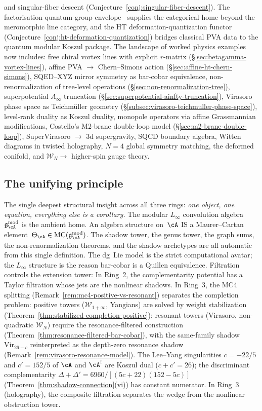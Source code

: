 \begin{enumerate}
  and singular-fiber descent
  (Conjecture~\ref{conj:singular-fiber-descent}).
  The factorisation quantum-group envelope~\cite{Latyntsev23}
  supplies the categorical home beyond the meromorphic line category,
  and the HT deformation-quantization functor
  (Conjecture~\ref{conj:ht-deformation-quantization})
  bridges classical PVA data to the quantum modular Koszul package.
  The landscape of worked physics examples now includes:
  free chiral vortex lines with explicit $r$-matrix
  (\S\ref{sec:betagamma-vortex-lines}),
  affine PVA $\to$ Chern--Simons action
  (\S\ref{sec:affine-ht-chern-simons}),
  SQED--XYZ mirror symmetry as bar-cobar equivalence,
  non-renormalization of tree-level operations
  (\S\ref{sec:non-renormalization-tree}),
  superpotential $A_\infty$ truncation
  (\S\ref{sec:superpotential-ainfty-truncation}),
  Virasoro phase space as Teichm\"uller geometry
  (\S\ref{subsec:virasoro-teichmuller-phase-space}),
  level-rank duality as Koszul duality,
  monopole operators via affine Grassmannian modifications,
  Costello's M2-brane double-loop model
  (\S\ref{sec:m2-brane-double-loop}),
  SuperVirasoro $\to$ 3d supergravity,
  SQCD boundary algebra,
  Witten diagrams in twisted holography,
  $N=4$ global symmetry matching,
  the deformed conifold,
  and $\mathcal{W}_N \to$ higher-spin gauge theory.
\end{enumerate}

\subsection*{The unifying principle}
The single deepest structural insight across all three rings:
\emph{one object, one equation, everything else is a corollary.}
The modular $L_\infty$ convolution algebra~$\mathfrak{g}_\cA^{\mathrm{mod}}$
is the ambient home.  An algebra structure on~$\cA$ IS a Maurer--Cartan
element~$\Theta_\cA \in \mathrm{MC}(\mathfrak{g}_\cA^{\mathrm{mod}})$.
The shadow tower, the genus tower, the graph sums, the non-renormalization
theorems, and the shadow archetypes are all automatic from this single
definition.  The dg~Lie model is the strict computational avatar;
the $L_\infty$ structure is the reason bar-cobar is a Quillen equivalence.
Filtration controls the extension tower:
In Ring~2, the complementarity potential has a Taylor filtration
whose jets are the nonlinear shadows.  In Ring~3, the MC4 splitting
(Remark~\ref{rem:mc4-positive-vs-resonant}) separates
the completion problem:
positive towers ($\mathcal{W}_{1+\infty}$, Yangians) are
solved by weight stabilization
(Theorem~\ref{thm:stabilized-completion-positive});
resonant towers (Virasoro, non-quadratic $\mathcal{W}_N$) require the
resonance-filtered construction
(Theorem~\ref{thm:resonance-filtered-bar-cobar}),
with the same-family shadow $\mathrm{Vir}_{26-c}$ reinterpreted as
the depth-zero resonance shadow
(Remark~\ref{rem:virasoro-resonance-model}).
The Lee--Yang singularities $c = -22/5$ and $c' = 152/5$ of $\cA$ and $\cA^!$ are Koszul dual ($c + c' = 26$); the discriminant complementarity $\Delta + \Delta' = 6960/[(5c{+}22)(152{-}5c)]$ (Theorem~\ref{thm:shadow-connection}(vi)) has constant numerator.
In Ring~3 (holography),
the composite filtration separates the wedge from the nonlinear
obstruction tower.

